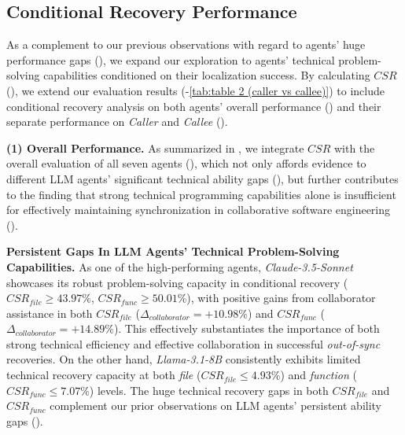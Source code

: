 \subsection{Conditional Recovery Performance}
\label{Appendix C1: Conditional Recovery Performance}

As a complement to our previous observations with regard to agents' huge performance gaps (), we expand our exploration to agents' technical problem-solving capabilities conditioned on their localization success.
By calculating $CSR$ (), we extend our evaluation results (-\ref{tab:table 2 (caller vs callee)}) to include conditional recovery analysis on both agents' overall performance () and their separate performance on \textit{Caller} and \textit{Callee} ().



\textbf{(1) Overall Performance.}
As summarized in , we integrate $CSR$ with the overall evaluation of all seven agents (), which not only affords evidence to different LLM agents' significant technical ability gaps (), but further contributes to the finding that strong technical programming capabilities alone is insufficient for effectively maintaining synchronization in collaborative software engineering ().

\textbf{Persistent Gaps In LLM Agents' Technical Problem-Solving Capabilities.}
As one of the high-performing agents, \textit{Claude-3.5-Sonnet} showcases its robust problem-solving capacity in conditional recovery ($CSR_{file} \geq 43.97\%$, $CSR_{func} \geq 50.01\%$), with positive gains from collaborator assistance in both $CSR_{file}$ ($\Delta_{\textit{collaborator}}=+10.98\%$) and $CSR_{func}$ ($\Delta_{\textit{collaborator}}=+14.89\%$). This effectively substantiates the importance of both strong technical efficiency and effective collaboration in successful \textit{out-of-sync} recoveries.
On the other hand, \textit{Llama-3.1-8B} consistently exhibits limited technical recovery capacity at both \textit{file} ($CSR_{file} \leq 4.93\%$) and \textit{function} ($CSR_{func} \leq 7.07\%$) levels.
The huge technical recovery gaps in both $CSR_{file}$ and $CSR_{func}$ complement our prior observations on LLM agents' persistent ability gaps ().



